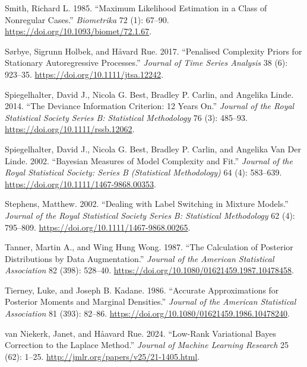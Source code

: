 \documentclass[
  11pt,
  letterpaper,
]{scrbook}
\newlength{\cslhangindent}
\newenvironment{CSLReferences}[2] %
 {\begin{list}{}{%
  \setlength{\itemindent}{0pt}
  \setlength{\leftmargin}{0pt}
  \setlength{\parsep}{0pt}
  \ifodd #1
   \setlength{\leftmargin}{\cslhangindent}
   \setlength{\itemindent}{-1\cslhangindent}
  \fi
  \setlength{\itemsep}{#2\baselineskip}}}
 {\end{list}}
\theoremstyle{definition}
\theoremstyle{plain}
\theoremstyle{plain}
\theoremstyle{plain}
\theoremstyle{definition}
\theoremstyle{definition}
\theoremstyle{remark}
\begin{document}
\begin{CSLReferences}{1}{0}
Smith, Richard L. 1985. {``Maximum Likelihood Estimation in a Class of
Nonregular Cases.''} \emph{Biometrika} 72 (1): 67--90.
\url{https://doi.org/10.1093/biomet/72.1.67}.

Sørbye, Sigrunn Holbek, and Håvard Rue. 2017. {``Penalised Complexity
Priors for Stationary Autoregressive Processes.''} \emph{Journal of Time
Series Analysis} 38 (6): 923--35.
\url{https://doi.org/10.1111/jtsa.12242}.

Spiegelhalter, David J., Nicola G. Best, Bradley P. Carlin, and Angelika
Linde. 2014. {``The Deviance Information Criterion: 12 Years On.''}
\emph{Journal of the Royal Statistical Society Series B: Statistical
Methodology} 76 (3): 485--93. \url{https://doi.org/10.1111/rssb.12062}.

Spiegelhalter, David J., Nicola G. Best, Bradley P. Carlin, and Angelika
Van Der Linde. 2002. {``Bayesian Measures of Model Complexity and
Fit.''} \emph{Journal of the Royal Statistical Society: Series B
(Statistical Methodology)} 64 (4): 583--639.
\url{https://doi.org/10.1111/1467-9868.00353}.

Stephens, Matthew. 2002. {``Dealing with Label Switching in Mixture
Models.''} \emph{Journal of the Royal Statistical Society Series B:
Statistical Methodology} 62 (4): 795--809.
\url{https://doi.org/10.1111/1467-9868.00265}.

Tanner, Martin A., and Wing Hung Wong. 1987. {``The Calculation of
Posterior Distributions by Data Augmentation.''} \emph{Journal of the
American Statistical Association} 82 (398): 528--40.
\url{https://doi.org/10.1080/01621459.1987.10478458}.

Tierney, Luke, and Joseph B. Kadane. 1986. {``Accurate Approximations
for Posterior Moments and Marginal Densities.''} \emph{Journal of the
American Statistical Association} 81 (393): 82--86.
\url{https://doi.org/10.1080/01621459.1986.10478240}.

van Niekerk, Janet, and Håavard Rue. 2024. {``Low-Rank Variational
{B}ayes Correction to the {L}aplace Method.''} \emph{Journal of Machine
Learning Research} 25 (62): 1--25.
\url{http://jmlr.org/papers/v25/21-1405.html}.


\end{CSLReferences}
\end{document}
